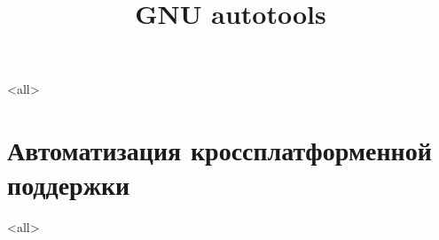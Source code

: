 
\mode<all>{}

\title[Toolchain]{GNU autotools}


\begin{frame}
	\frametitle{}
	\titlepage
	\vspace{-0.5cm}
	\begin{center}
	\end{center}
\end{frame}

\begin{frame}
	\tableofcontents
\end{frame}




\section{Автоматизация кроссплатформенной поддержки}

\mode<all>{}


